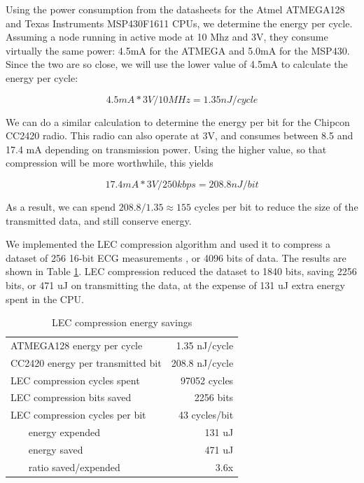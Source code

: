 Using the power consumption from the datasheets for the Atmel ATMEGA128 \cite{Atmel:ATMEGA128Datasheet} and Texas Instruments MSP430F1611 \cite{TexasInstrumentsIncorporated:MSP430F1611Datasheet} CPUs, we determine the energy per cycle. Assuming a node running in active mode at 10 Mhz and 3V, they consume virtually the same power: 4.5mA for the ATMEGA and 5.0mA for the MSP430. Since the two are so close, we will use the lower value of 4.5mA to calculate the energy per cycle:

\begin{equation}
	4.5mA * 3V / 10MHz = 1.35nJ / cycle  
\end{equation}


We can do a similar calculation to determine the energy per bit for the Chipcon CC2420 radio.  This radio can also operate at 3V, and consumes between 8.5 and 17.4 mA depending on transmission power. Using the higher value, so that compression will be more worthwhile, this yields

\begin{equation}
  17.4mA * 3V / 250kbps = 208.8nJ / bit
\end{equation}

As a result, we can spend $208.8/1.35 \approx 155$ cycles per bit to reduce the size of the transmitted data, and still conserve energy.

We implemented the LEC compression algorithm and used it to compress a dataset of 256 16-bit ECG measurements \cite{physionet-ecg-data}, or 4096 bits of data. The results are shown in Table \ref{tbl-lec-energy}. LEC compression reduced the dataset to 1840 bits, saving 2256 bits, or 471 uJ on transmitting the data, at the expense of 131 uJ extra energy spent in the CPU.

\begin{table}[H]
\centering
\caption{LEC compression energy savings}
\label{tbl-lec-energy}
\begin{tabular}{lr}
\toprule
\midrule
ATMEGA128 energy per cycle            & 1.35 nJ/cycle  \\
CC2420 energy per transmitted bit     & 208.8 nJ/cycle  \\
\midrule
LEC compression cycles spent          & 97052 cycles\\
LEC compression bits saved            & 2256 bits \\
LEC compression cycles per bit        & 43 cycles/bit \\
~~~ energy expended                   & 131 uJ \\
~~~ energy saved                      & 471 uJ \\
~~~ ratio saved/expended              & 3.6x \\
\bottomrule
\end{tabular}
\end{table}

